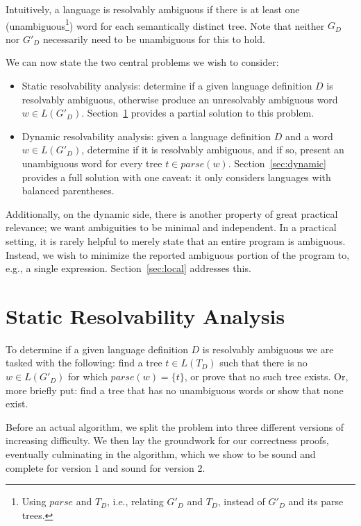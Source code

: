 \documentclass[acmsmall,review,anonymous]{acmart}\settopmatter{printfolios=true,printccs=false,printacmref=false}
\newcommand{\parse}{\mathit{parse}} %
\begin{document}
\noindent Intuitively, a language is resolvably ambiguous if there is at least one (unambiguous\footnote{Using $\parse$ and $T_D$, i.e., relating $G'_D$ and $T_D$, instead of $G'_D$ and its parse trees.}) word for each semantically distinct tree. Note that neither $G_D$ nor $G'_D$ necessarily need to be unambiguous for this to hold.

We can now state the two central problems we wish to consider:

\begin{itemize}
\item Static resolvability analysis: determine if a given language definition $D$ is resolvably ambiguous, otherwise produce an unresolvably ambiguous word $w \in L(G'_D)$. Section~\ref{sec:static} provides a partial solution to this problem.
\item Dynamic resolvability analysis: given a language definition $D$ and a word $w \in L(G'_D)$, determine if it is resolvably ambiguous, and if so, present an unambiguous word for every tree $t \in \parse(w)$. Section~\ref{sec:dynamic} provides a full solution with one caveat: it only considers languages with balanced parentheses.
\end{itemize}

\noindent Additionally, on the dynamic side, there is another property of great practical relevance; we want ambiguities to be minimal and independent. In a practical setting, it is rarely helpful to merely state that an entire program is ambiguous. Instead, we wish to minimize the reported ambiguous portion of the program to, e.g., a single expression. Section~\ref{sec:local} addresses this.

\section{Static Resolvability Analysis} \label{sec:static}

To determine if a given language definition $D$ is resolvably ambiguous we are tasked with the following: find a tree $t \in L(T_D)$ such that there is no $w \in L(G'_D)$ for which $\parse(w) = \{t\}$, or prove that no such tree exists. Or, more briefly put: find a tree that has no unambiguous words or show that none exist.

Before an actual algorithm, we split the problem into three different versions of increasing difficulty. We then lay the groundwork for our correctness proofs, eventually culminating in the algorithm, which we show to be sound and complete for version 1 and sound for version 2.
\end{document}
